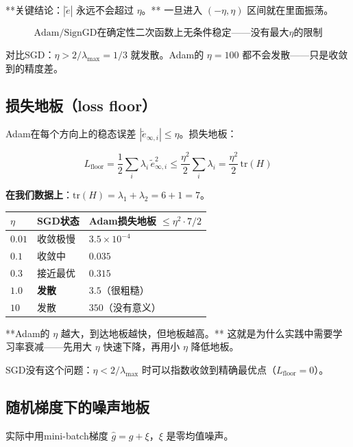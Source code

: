 \documentclass[12pt,a4paper]{article}
\begin{document}
**关键结论：$|\tilde{e}|$ 永远不会超过 $\eta$。** 一旦进入 $(-\eta, \eta)$ 区间就在里面振荡。


\[\boxed{\text{Adam/SignGD在确定性二次函数上无条件稳定——没有最大}\eta\text{的限制}}\]

对比SGD：$\eta > 2/\lambda_{\max} = 1/3$ 就发散。Adam的 $\eta = 100$ 都不会发散——只是收敛到的精度差。


\subsection{损失地板（loss floor）}

Adam在每个方向上的稳态误差 $|\tilde{e}_{\infty,i}| \le \eta$。损失地板：


\[L_{\text{floor}} = \frac{1}{2}\sum_i \lambda_i\,\tilde{e}_{\infty,i}^2 \le \frac{\eta^2}{2}\sum_i \lambda_i = \frac{\eta^2}{2}\,\text{tr}(H)\]

\textbf{在我们数据上}：$\text{tr}(H) = \lambda_1 + \lambda_2 = 6 + 1 = 7$。








\begin{center}\small
\begin{longtable}{|l|l|l|}
\hline
$\eta$ & SGD状态 & Adam损失地板 $\le \eta^2 \cdot 7/2$ \\
\hline
$0.01$ & 收敛极慢 & $3.5 \times 10^{-4}$ \\
$0.1$ & 收敛中 & $0.035$ \\
$0.3$ & 接近最优 & $0.315$ \\
$1.0$ & \textbf{发散} & $3.5$（很粗糙） \\
$10$ & 发散 & $350$（没有意义） \\
\hline
\end{longtable}
\end{center}


**Adam的 $\eta$ 越大，到达地板越快，但地板越高。** 这就是为什么实践中需要学习率衰减——先用大 $\eta$ 快速下降，再用小 $\eta$ 降低地板。

SGD没有这个问题：$\eta < 2/\lambda_{\max}$ 时可以指数收敛到精确最优点（$L_{\text{floor}} = 0$）。


\subsection{随机梯度下的噪声地板}

实际中用mini-batch梯度 $\hat{g} = g + \xi$，$\xi$ 是零均值噪声。
\end{document}
